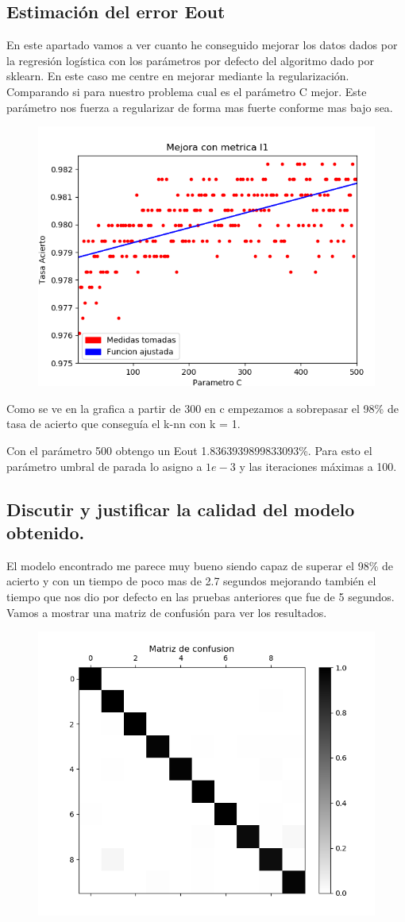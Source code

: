 \documentclass[titlepage]{article}
\begin{document}
\subsection{Estimación del error Eout}
En este apartado vamos a ver cuanto he conseguido mejorar los datos dados por la regresión logística con los parámetros por defecto del algoritmo dado por sklearn.
En este caso me centre en mejorar mediante la regularización. Comparando si para nuestro problema cual es el parámetro C mejor. Este parámetro nos fuerza a regularizar de forma mas fuerte conforme mas bajo sea. 
\begin{figure}[H]
	\centering
	\includegraphics[width=0.7\linewidth]{screenshot007}
\end{figure}
Como se ve en la grafica a partir  de 300 en c empezamos a sobrepasar el 98\% de tasa de acierto que conseguía el k-nn con k = 1.

Con el parámetro 500 obtengo un Eout 1.8363939899833093\%.
Para esto el parámetro umbral de parada lo asigno a $1e-3$ y las iteraciones máximas a 100.

\subsection{Discutir y justificar la calidad del modelo obtenido.}
El modelo encontrado me parece muy bueno siendo capaz de superar el 98\% de acierto y con un tiempo de poco mas de 2.7 segundos mejorando también el tiempo que nos dio por defecto en las pruebas anteriores que fue de 5 segundos.
Vamos a mostrar una matriz de confusión para ver los resultados.
\begin{figure}[H]
	\centering
	\includegraphics[width=0.7\linewidth]{screenshot008}

\end{figure}
\end{document}

